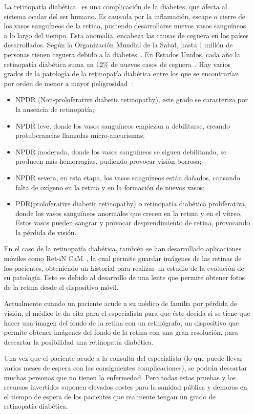 La retinopatía diabética~\cite{enfermedad-ocular-diabetica} es una complicación de la diabetes, que afecta al sistema ocular del ser humano. Es causada por la inflamación, escape o cierre de los vasos sanguíneos de la retina, pudiendo desarrollarse nuevos vasos sanguíneos a lo largo del tiempo. Esta anomalía, encabeza las causas de ceguera en los países desarrollados. Según la Organización Mundial de la Salud, hasta 1 millón de personas tienen ceguera debido a la diabetes~\cite{oms-diabetes}. 
En Estados Unidos, cada año la retinopatía diabética suma un 12\% de nuevos casos de ceguera~\cite{porcentaje-afectados-eeuu}.
Hay varios grados de la patología de la retinopatía diabética entre los que se encontrarían por orden de menor a mayor peligrosidad~\cite{grados-retinopatia}: 
\begin{itemize}
    \item NPDR (Non-proloferative diabetic retinopathy), este grado se caracteriza por la ausencia de retinopatía;
    \item NPDR leve, donde los vasos sanguíneos empiezan a debilitarse, creando protuberancias llamadas micro-aneurismas;
    \item NPDR moderada, donde los vasos sanguíneos se siguen debilitando, se producen más hemorragias, pudiendo provocar visión borrosa;
    \item NPDR severa, en esta etapa, los vasos sanguíneos están dañados, causando falta de oxígeno en la retina y en la formación de nuevos vasos;
    \item PDR(proloferative diabetic retinopathy) o retinopatía diabética proliferativa, donde los vasos sanguíneos anormales que crecen en la retina y en el vítreo. Estos vasos pueden sangrar y provocar desprendimiento de retina, provocando la pérdida de visión.
\end{itemize} 

En el caso de la retinopatía diabética, también se han desarrollado aplicaciones móviles como Ret-iN CaM~\cite{ret-in-cam}, la cual permite guardar imágenes de las retinas de los pacientes, obteniendo un historial para realizar un estudio de la evolución de su patología. Esto es debido al desarrollo de una lente que permite obtener fotos de la retina desde el dispositivo móvil.


Actualmente cuando un paciente acude a su médico de familia por pérdida de visión, el médico le da cita para el especialista para que éste decida si se tiene que hacer una imagen del fondo de la retina con un retinógrafo, un dispositivo que permite obtener imágenes del fondo de la retina con una gran resolución, para descartar la posibilidad una retinopatía diabética. 
Una vez que el paciente acude a la consulta del especialista (lo que puede llevar varios meses de espera con las consiguientes complicaciones), se podrán descartar muchas personas que no tienen la enfermedad. Pero todas estas pruebas y los recursos invertidos suponen elevados costes para la sanidad pública y demoras en el tiempo de espera de los pacientes que realmente tengan un grado de retinopatía diabética.
 
